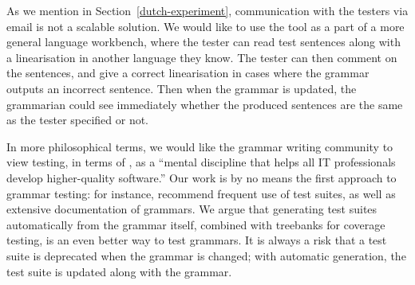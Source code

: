 As we mention in Section~\ref{dutch-experiment}, communication with
the testers via email is not a scalable solution. We would like to
use the tool as a part of a more general language workbench, where
the tester can read test sentences along with a linearisation in another
language they know. The tester can then comment on the sentences, and
give a correct linearisation in cases where the grammar outputs an incorrect
sentence. Then when the grammar is updated, the grammarian could see immediately
whether the produced sentences are the same as the tester specified or not.

%
%

In more philosophical terms, we would like the grammar writing
community to view testing, in terms of \citet{beizer2003software}, as
a ``mental discipline that helps all IT professionals develop
higher-quality software.''  Our work is by no means the first approach
to grammar testing: for instance, \citet{butt1999lfg} recommend
frequent use of test suites, as well as extensive documentation of
grammars. We argue that generating test suites automatically from the
grammar itself, combined with treebanks for coverage testing, is an
even better way to test grammars. It is always a risk that a test
suite is deprecated when the grammar is changed; with automatic
generation, the test suite is updated along with the grammar.





